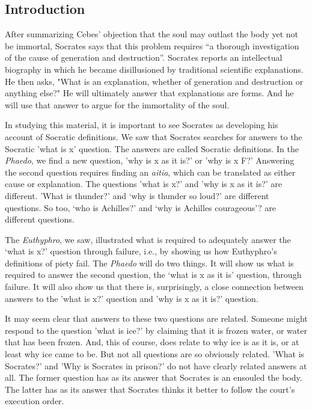\documentclass[oneside]{article}
\begin{document}
\thispagestyle{fancy}
\subsection*{Introduction}
After summarizing Cebes' objection that the soul may outlast the body yet not be immortal, Socrates says that this problem requires ``a thorough investigation of the cause of generation and destruction''. Socrates reports an intellectual biography in which he became disillusioned by traditional scientific explanations. He then asks, "What is an explanation, whether of generation and destruction or anything else?" He will ultimately answer that explanations are forms. And he will use that answer to argue for the immortality of the soul. 

In studying this material, it is important to see Socrates as developing his account of Socratic definitions. We saw that Socrates searches for answers to the Socratic 'what is x' question. The answers are called Socratic definitions. In the \emph{Phaedo}, we find a new question, 'why is x as it is?' or 'why is x F?' Answering the second question requires finding an \emph{aitia}, which can be translated as either cause or explanation. The questions 'what is x?' and 'why is x as it is?' are different. 'What is thunder?' and `why is thunder so loud?' are different questions. So too, `who is Achilles?' and `why is Achilles courageous'? are different questions.  

The \emph{Euthyphro}, we saw, illustrated what is required to adequately answer the `what is x?' question through failure, i.e., by showing us how Euthyphro's definitions of piety fail. The \emph{Phaedo} will do two things. It will show us what is required to answer the second question,  the `what is x as it is' question, through failure. It will also show us that there is, surprisingly, a close connection between answers to the 'what is x?' question and 'why is x as it is?' question. 

It may seem clear that answers to these two questions are related. Someone might respond to the question 'what is ice?' by claiming that it is frozen water, or water that has been frozen. And, this of course, does relate to why ice is as it is, or at least why ice came to be. But not all questions are so obviously related. 'What is Socrates?' and 'Why is Socrates in prison?' do not have clearly related answers at all. The former question has as its answer that Socrates is an ensouled the body. The latter has as its answer that Socrates thinks it better to follow the court's execution order. 
\end{document}
